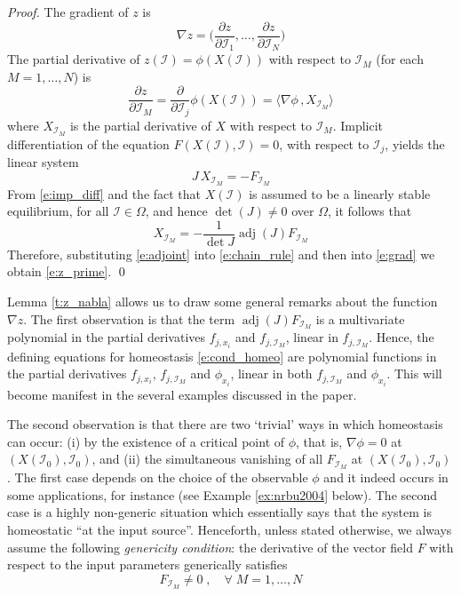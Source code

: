 \documentclass[a4paper,fleqn]{cas-dc}
\newcommand{\II}{{\mathcal I}}
\DeclareMathOperator{\adj}{adj}
\begin{document}
\begin{proof}
The gradient of $z$ is
\begin{equation} \label{e:grad}
\nabla z = \bigg(\frac{\partial z}{\partial \II_1},\ldots,
\frac{\partial z}{\partial \II_N}\bigg)
\end{equation}
The partial derivative of $z(\mathcal{I})=\phi(X(\mathcal{I}))$ with respect to $\II_M$ (for each $M=1,\ldots,N$) is
\begin{equation} \label{e:chain_rule}
\frac{\partial z}{\partial \II_M} = \frac{\partial}{\partial \II_j} \phi(X(\II)) = \langle \nabla \phi\, ,  X_{\II_M} \rangle
\end{equation}
where $X_{\II_M}$ is the partial derivative of $X$ with respect to $\II_M$.
Implicit differentiation of the equation $F(X(\mathcal{I}),\mathcal{I})=0$, with respect to $\II_j$, yields the linear system
\begin{equation} \label{e:imp_diff}
J \, X_{\II_M} = - F_{\II_M}
\end{equation}
From \eqref{e:imp_diff} and the fact that $X(\II)$ is assumed to be a linearly stable equilibrium, for all $\II\in \Omega$, and hence $\det(J)\neq 0$ over $\Omega$, it follows that
\begin{equation} \label{e:adjoint}
X_{\II_M} = - \frac{1}{\det J} \adj(J) F_{\II_M}
\end{equation}
Therefore, substituting \eqref{e:adjoint} into \eqref{e:chain_rule} and then into \eqref{e:grad} we obtain \eqref{e:z_prime}.
\qed
\end{proof}

Lemma \ref{t:z_nabla} allows us to draw some general remarks about the function $\nabla z$.
The first observation is that the term $\adj(J) F_{\II_M}$ is a multivariate polynomial in the partial derivatives $f_{j,x_i}$ and $f_{j,\II_M}$, linear in $f_{j,\II_M}$.
Hence, the defining equations for homeostasis \eqref{e:cond_homeo} are polynomial functions in the partial derivatives $f_{j,x_i}$,  $f_{j,\II_M}$ and $\phi_{x_i}$, linear in both $f_{j,\II_M}$ and $\phi_{x_i}$.
This will become manifest in the several examples discussed in the paper.

The second observation is that there are two `trivial' ways in which homeostasis can occur: (i) by the existence of a critical point of $\phi$, that is, $\nabla\phi=0$ at $(X(\II_0),\II_0)$, and (ii) the simultaneous vanishing of all $F_{\II_M}$ at $(X(\II_0),\II_0)$.
The first case depends on the choice of the observable $\phi$ and it indeed occurs in some applications, for instance \cite{nrbu2004} (see Example \ref{ex:nrbu2004} below).
The second case is a highly non-generic situation which essentially says that the system is homeostatic ``at the input source''.
Henceforth, unless stated otherwise, we always assume the following {\em genericity condition}: the derivative of the vector field $F$ with respect to the input parameters generically satisfies
\begin{equation} \label{eq:genericity_condition}
F_{\II_M}\neq 0 
\; , \quad \forall\; M=1,\ldots,N
\end{equation}
\end{document}
